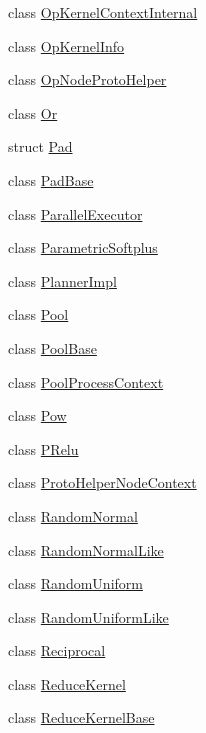 \begin{DoxyCompactItemize}
\item 
class \mbox{\hyperlink{classonnxruntime_1_1OpKernelContextInternal}{Op\+Kernel\+Context\+Internal}}
\item 
class \mbox{\hyperlink{classonnxruntime_1_1OpKernelInfo}{Op\+Kernel\+Info}}
\item 
class \mbox{\hyperlink{classonnxruntime_1_1OpNodeProtoHelper}{Op\+Node\+Proto\+Helper}}
\item 
class \mbox{\hyperlink{classonnxruntime_1_1Or}{Or}}
\item 
struct \mbox{\hyperlink{structonnxruntime_1_1Pad}{Pad}}
\item 
class \mbox{\hyperlink{classonnxruntime_1_1PadBase}{Pad\+Base}}
\item 
class \mbox{\hyperlink{classonnxruntime_1_1ParallelExecutor}{Parallel\+Executor}}
\item 
class \mbox{\hyperlink{classonnxruntime_1_1ParametricSoftplus}{Parametric\+Softplus}}
\item 
class \mbox{\hyperlink{classonnxruntime_1_1PlannerImpl}{Planner\+Impl}}
\item 
class \mbox{\hyperlink{classonnxruntime_1_1Pool}{Pool}}
\item 
class \mbox{\hyperlink{classonnxruntime_1_1PoolBase}{Pool\+Base}}
\item 
class \mbox{\hyperlink{classonnxruntime_1_1PoolProcessContext}{Pool\+Process\+Context}}
\item 
class \mbox{\hyperlink{classonnxruntime_1_1Pow}{Pow}}
\item 
class \mbox{\hyperlink{classonnxruntime_1_1PRelu}{P\+Relu}}
\item 
class \mbox{\hyperlink{classonnxruntime_1_1ProtoHelperNodeContext}{Proto\+Helper\+Node\+Context}}
\item 
class \mbox{\hyperlink{classonnxruntime_1_1RandomNormal}{Random\+Normal}}
\item 
class \mbox{\hyperlink{classonnxruntime_1_1RandomNormalLike}{Random\+Normal\+Like}}
\item 
class \mbox{\hyperlink{classonnxruntime_1_1RandomUniform}{Random\+Uniform}}
\item 
class \mbox{\hyperlink{classonnxruntime_1_1RandomUniformLike}{Random\+Uniform\+Like}}
\item 
class \mbox{\hyperlink{classonnxruntime_1_1Reciprocal}{Reciprocal}}
\item 
class \mbox{\hyperlink{classonnxruntime_1_1ReduceKernel}{Reduce\+Kernel}}
\item 
class \mbox{\hyperlink{classonnxruntime_1_1ReduceKernelBase}{Reduce\+Kernel\+Base}}

\end{DoxyCompactItemize}
